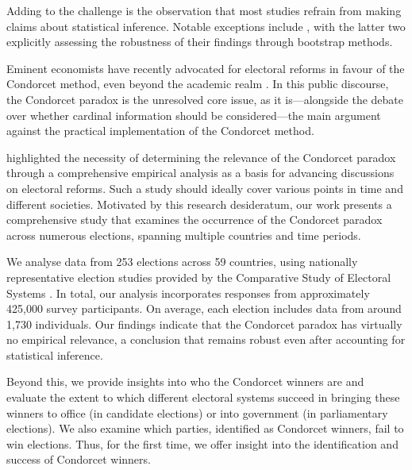 \documentclass[12pt]{scrartcl}
\newcommand{\nbelections}{253 }
\newcommand{\nbcountries}{59 }
\begin{document}
Adding to the challenge is the observation that most studies refrain from making claims about statistical inference. Notable exceptions include \cite{Potthoff2021, Desai2025, Regenwetter2007, Darmann2019}, with the latter two explicitly assessing the robustness of their findings through bootstrap methods.

Eminent economists have recently advocated for electoral reforms in favour of the Condorcet method, even beyond the academic realm \citep{Maskin2016, Maskin2017, Maskin2017a}. In this public discourse, the Condorcet paradox is the unresolved core issue, as it is—alongside the debate over whether cardinal information should be considered—the main argument against the practical implementation of the Condorcet method.

\citet[Ch.~10.2]{Sen2017} highlighted the necessity of determining the relevance of the Condorcet paradox through a comprehensive empirical analysis as a basis for advancing discussions on electoral reforms. Such a study should ideally cover various points in time and different societies. Motivated by this research desideratum, our work presents a comprehensive study that examines the occurrence of the Condorcet paradox across numerous elections, spanning multiple countries and time periods. 

We analyse data from \nbelections elections across \nbcountries countries, using nationally representative election studies provided by the Comparative Study of Electoral Systems \citep{CSES2020}. In total, our analysis incorporates responses from approximately 425,000 survey participants. On average, each election includes data from around 1,730 individuals. Our findings indicate that the Condorcet paradox has virtually no empirical relevance, a conclusion that remains robust even after accounting for statistical inference. 

Beyond this, we provide insights into who the Condorcet winners are and evaluate the extent to which different electoral systems succeed in bringing these winners to office (in candidate elections) or into government (in parliamentary elections). We also examine which parties, identified as Condorcet winners, fail to win elections. Thus, for the first time, we offer insight into the identification and success of Condorcet winners.
\end{document}
